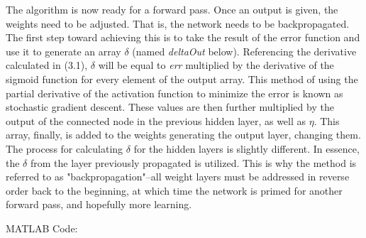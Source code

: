 \documentclass[letterpaper,11pt]{article}
\begin{document}
The algorithm is now ready for a forward pass. Once an output is given, the weights need to be adjusted. That is, the network needs to be backpropagated.\\

The first step toward achieving this is to take the result of the error function and use it to generate an array $\delta$ (named \emph{deltaOut} below). Referencing the derivative calculated in (3.1), $\delta$ will be equal to \emph{err} multiplied by the derivative of the sigmoid function for every element of the output array. This method of using the partial derivative of the activation function to minimize the error is known as stochastic gradient descent. These values are then further multiplied by the output of the connected node in the previous hidden layer, as well as $\eta$. This array, finally, is added to the weights generating the output layer, changing them.\\

The process for calculating $\delta$ for the hidden layers is slightly different. In essence, the $\delta$ from the layer previously propagated is utilized. This is why the method is referred to as "backpropagation"--all weight layers must be addressed in reverse order back to the beginning, at which time the network is primed for another forward pass, and hopefully more learning.

\vspace{5mm}
MATLAB Code:
\end{document}
